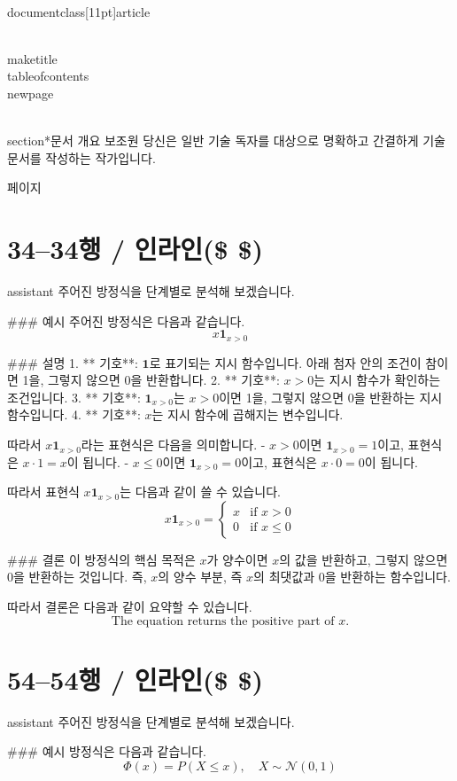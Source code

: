\\documentclass[11pt]{article}
\begin{document}
\\maketitle
\\tableofcontents
\\newpage

\\section*{문서 개요}
보조원
당신은 일반 기술 독자를 대상으로 명확하고 간결하게 기술 문서를 작성하는 작가입니다.

\새 페이지

\section*{34–34행 / 인라인(\$ \$) }
assistant
주어진 방정식을 단계별로 분석해 보겠습니다.

### 예시
주어진 방정식은 다음과 같습니다.
\[ x\mathbf{1}_{x>0} \]

### 설명
1. ** 기호**: \(\mathbf{1}\)로 표기되는 지시 함수입니다. 아래 첨자 안의 조건이 참이면 1을, 그렇지 않으면 0을 반환합니다.
2. ** 기호**: \(x > 0\)는 지시 함수가 확인하는 조건입니다.
3. ** 기호**: \(\mathbf{1}_{x>0}\)는 \(x > 0\)이면 1을, 그렇지 않으면 0을 반환하는 지시 함수입니다.
4. ** 기호**: \(x\)는 지시 함수에 곱해지는 변수입니다.

따라서 \(x\mathbf{1}_{x>0}\)라는 표현식은 다음을 의미합니다.
- \(x > 0\)이면 \(\mathbf{1}_{x>0} = 1\)이고, 표현식은 \(x \cdot 1 = x\)이 됩니다.
- \(x \leq 0\)이면 \(\mathbf{1}_{x>0} = 0\)이고, 표현식은 \(x \cdot 0 = 0\)이 됩니다.

따라서 표현식 \(x\mathbf{1}_{x>0}\)는 다음과 같이 쓸 수 있습니다.
\[ x\mathbf{1}_{x>0} = \begin{cases} 
x & \text{if } x > 0 \\
0 & \text{if } x \leq 0 
\end{cases} \]

### 결론
이 방정식의 핵심 목적은 \(x\)가 양수이면 \(x\)의 값을 반환하고, 그렇지 않으면 0을 반환하는 것입니다. 즉, \(x\)의 양수 부분, 즉 \(x\)의 최댓값과 0을 반환하는 함수입니다.

따라서 결론은 다음과 같이 요약할 수 있습니다.
\[ \boxed{\text{The equation returns the positive part of } x.} \]

\section*{54–54행 / 인라인(\$ \$) }
assistant
주어진 방정식을 단계별로 분석해 보겠습니다.

### 예시
방정식은 다음과 같습니다.
\[
\Phi(x) = P(X \le x), \quad X \sim \mathcal{N}(0,1)
\]
\end{document}
